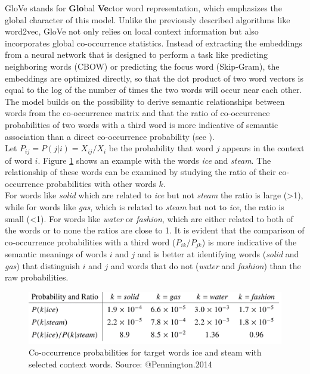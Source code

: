 \documentclass[]{krantz}
\begin{document}
GloVe stands for \textbf{Glo}bal \textbf{Ve}ctor word representation, which emphasizes the global character of this model. Unlike the previously described algorithms like word2vec, GloVe not only relies on local context information but also incorporates global co-occurrence statistics. Instead of extracting the embeddings from a neural network that is designed to perform a task like predicting neighboring words (CBOW) or predicting the focus word (Skip-Gram), the embeddings are optimized directly, so that the dot product of two word vectors is equal to the log of the number of times the two words will occur near each other. The model builds on the possibility to derive semantic relationships between words from the co-occurrence matrix and that the ratio of co-occurrence probabilities of two words with a third word is more indicative of semantic association than a direct co-occurrence probability (see \citet{Pennington.2014}).\\
Let \(P_{ij} = P(j|i) = X_{ij}/X_i\) be the probability that word \(j\) appears in the context of word \(i\). Figure \ref{fig:glove} shows an example with the words \emph{ice} and \emph{steam}. The relationship of these words can be examined by studying the ratio of their co-occurrence probabilities with other words \(k\).\\
For words like \emph{solid} which are related to \emph{ice} but not \emph{steam} the ratio is large (\textgreater{}1), while for words like \emph{gas}, which is related to \emph{steam} but not to \emph{ice}, the ratio is small (\textless{}1). For words like \emph{water} or \emph{fashion}, which are either related to both of the words or to none the ratios are close to 1. It is evident that the comparison of co-occurrence probabilities with a third word (\(P_{ik}/P_{jk}\)) is more indicative of the semantic meanings of words \(i\) and \(j\) and is better at identifying words (\emph{solid} and \emph{gas}) that distinguish \(i\) and \(j\) and words that do not (\emph{water} and \emph{fashion}) than the raw probabilities.

\begin{figure}
\includegraphics[width=\textwidth]{figures/01-01-foundations-applications-of-modern-NLP/01-01_glove_ratios} \caption{Co-occurrence probabilities for target words ice and steam with selected context words.  Source: @Pennington.2014}\label{fig:glove}
\end{figure}
\end{document}
